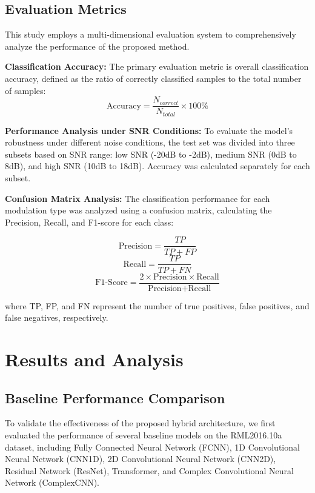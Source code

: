\documentclass[conference]{IEEEtran}
\begin{document}
\subsection{Evaluation Metrics}

This study employs a multi-dimensional evaluation system to comprehensively analyze the performance of the proposed method.

\textbf{Classification Accuracy:}
The primary evaluation metric is overall classification accuracy, defined as the ratio of correctly classified samples to the total number of samples:
\begin{equation}
\text{Accuracy} = \frac{N_{correct}}{N_{total}} \times 100\%
\end{equation}

\textbf{Performance Analysis under SNR Conditions:}
To evaluate the model's robustness under different noise conditions, the test set was divided into three subsets based on SNR range: low SNR (-20dB to -2dB), medium SNR (0dB to 8dB), and high SNR (10dB to 18dB). Accuracy was calculated separately for each subset.

\textbf{Confusion Matrix Analysis:}
The classification performance for each modulation type was analyzed using a confusion matrix, calculating the Precision, Recall, and F1-score for each class:

\begin{equation}
\text{Precision} = \frac{TP}{TP + FP}
\end{equation}
\begin{equation}
\text{Recall} = \frac{TP}{TP + FN}
\end{equation}
\begin{equation}
\text{F1-Score} = \frac{2 \times \text{Precision} \times \text{Recall}}{\text{Precision} + \text{Recall}}
\end{equation}

where TP, FP, and FN represent the number of true positives, false positives, and false negatives, respectively.

\section{Results and Analysis}

\subsection{Baseline Performance Comparison}

To validate the effectiveness of the proposed hybrid architecture, we first evaluated the performance of several baseline models on the RML2016.10a dataset, including Fully Connected Neural Network (FCNN), 1D Convolutional Neural Network (CNN1D), 2D Convolutional Neural Network (CNN2D), Residual Network (ResNet), Transformer, and Complex Convolutional Neural Network (ComplexCNN).
\end{document}
